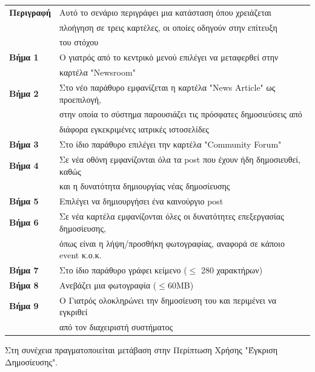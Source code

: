 \documentclass{article}
\newcommand\T{\rule{0pt}{2.6ex}}       %
\newcommand\B{\rule[-1.2ex]{0pt}{0pt}}
\begin{document}
 \begin{center}
     \begin{tabular}{|l|l|}
     \hline
      \textbf{Περιγραφή} & Αυτό το σενάριο περιγράφει μια κατάσταση όπου χρειάζεται \T \\& πλοήγηση σε τρεις καρτέλες, οι οποίες οδηγούν στην επίτευξη \\& του στόχου \B \\ 
      \hline
      \textbf{Βήμα 1} & Ο γιατρός από το κεντρικό μενού επιλέγει να μεταφερθεί στην \T \\& καρτέλα "Newsroom" \T\B \\
      \hline
      \textbf{Βήμα 2} & Στο νέο παράθυρο εμφανίζεται η καρτέλα "News Article" ως προεπιλογή, \T \\& στην οποία το σύστημα παρουσιάζει τις πρόσφατες δημοσιεύσεις από \\& διάφορα εγκεκριμένες ιατρικές ιστοσελίδες \B \\
      \hline
      \textbf{Βήμα 3} & Στο ίδιο παράθυρο επιλέγει την καρτέλα "Community Forum" \T\B \\
      \hline
      \textbf{Βήμα 4} & Σε νέα οθόνη εμφανίζονται όλα τα post που έχουν ήδη δημοσιευθεί, καθώς \T \\& και η δυνατότητα δημιουργίας νέας δημοσίευσης \B \\
      \hline
      \textbf{Βήμα 5} & Επιλέγει να δημιουργήσει ένα καινούργιο post \T\B \\
      \hline
      \textbf{Βήμα 6} & Σε νέα καρτέλα εμφανίζονται όλες οι δυνατότητες επεξεργασίας δημοσίευσης,\T \\& όπως είναι η λήψη/προσθήκη φωτογραφίας, αναφορά σε κάποιο event κ.ο.κ. \B \\
      \hline
      \textbf{Βήμα 7} & Στο ίδιο παράθυρο γράφει κείμενο ($\le$ 280 χαρακτήρων) \T\B \\
      \hline
      \textbf{Βήμα 8} & Ανεβάζει μια φωτογραφία ($\le$60MB) \T\B \\
      \hline
      \textbf{Βήμα 9} & Ο Γιατρός ολοκληρώνει την δημοσίευση του και περιμένει να εγκριθεί \T \\& από τον διαχειριστή συστήματος \B \\
      \hline      
     \end{tabular}
 \end{center}
 
Στη συνέχεια πραγματοποιείται μετάβαση στην Περίπτωση Χρήσης "Έγκριση Δημοσίευσης".\vspace{0.2cm}
\end{document}
